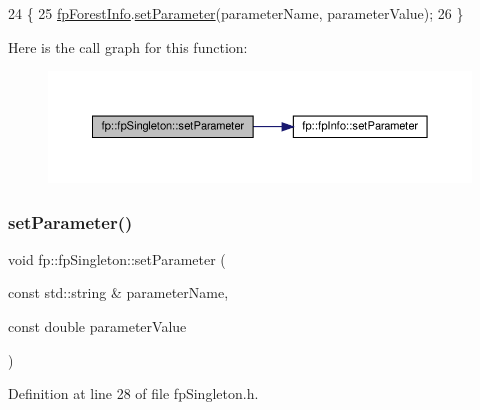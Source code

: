 \begin{DoxyCode}
24                                                                                                      \{
25                 \hyperlink{classfp_1_1fpSingleton_a85965009befa72a749ae498fa5b6ccfa}{fpForestInfo}.\hyperlink{classfp_1_1fpInfo_ae4c749c466e983cb312cc08d38b2796e}{setParameter}(parameterName, parameterValue);
26             \}
\end{DoxyCode}
Here is the call graph for this function\+:\nopagebreak
\begin{figure}[H]
\begin{center}
\leavevmode
\includegraphics[width=350pt]{classfp_1_1fpSingleton_a90f275b256694ea7b16577d547a33044_cgraph}
\end{center}
\end{figure}
\mbox{\label{classfp_1_1fpSingleton_a19dd80e98acb4dd3e82be5e744840d1f}} 
\subsubsection{\texorpdfstring{set\+Parameter()}{setParameter()}\hspace{0.1cm}{\footnotesize\ttfamily [2/3]}}
{\footnotesize\ttfamily void fp\+::fp\+Singleton\+::set\+Parameter (\begin{DoxyParamCaption}\item[{const std\+::string \&}]{parameter\+Name,  }\item[{const double}]{parameter\+Value }\end{DoxyParamCaption})\hspace{0.3cm}{\ttfamily [inline]}}



Definition at line 28 of file fp\+Singleton.\+h.


